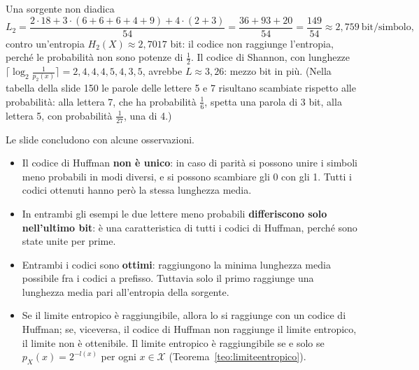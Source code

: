 \begin{esempio}{Una sorgente non diadica}
\[ L_2 = \frac{2 \cdot 18 + 3 \cdot (6 + 6 + 6 + 4 + 9) + 4 \cdot (2 + 3)}{54} = \frac{36 + 93 + 20}{54} = \frac{149}{54}
   \approx 2{,}759 \ \text{bit/simbolo} , \]
contro un'entropia $H_2(X) \approx 2{,}7017$ bit: il codice non raggiunge l'entropia, perché le probabilità non sono
potenze di $\frac12$. Il codice di Shannon, con lunghezze $\lceil \log_2 \frac{1}{p_2(x)} \rceil = 2, 4, 4, 4, 5, 4, 3,
5$, avrebbe $L \approx 3{,}26$: mezzo bit in più. (Nella tabella della slide 150 le parole delle lettere 5 e 7
risultano scambiate rispetto alle probabilità: alla lettera 7, che ha probabilità $\frac16$, spetta una parola di 3 bit,
alla lettera 5, con probabilità $\frac{1}{27}$, una di 4.)
\end{esempio}

Le slide concludono con alcune osservazioni.
\begin{itemize}
  \item Il codice di Huffman \textbf{non è unico}: in caso di parità si possono unire i simboli meno probabili in modi
        diversi, e si possono scambiare gli 0 con gli 1. Tutti i codici ottenuti hanno però la stessa lunghezza media.
  \item In entrambi gli esempi le due lettere meno probabili \textbf{differiscono solo nell'ultimo bit}: è una
        caratteristica di tutti i codici di Huffman, perché sono state unite per prime.
  \item Entrambi i codici sono \textbf{ottimi}: raggiungono la minima lunghezza media possibile fra i codici a prefisso.
        Tuttavia solo il primo raggiunge una lunghezza media pari all'entropia della sorgente.
  \item Se il limite entropico è raggiungibile, allora lo si raggiunge con un codice di Huffman; se, viceversa, il
        codice di Huffman non raggiunge il limite entropico, il limite non è ottenibile. Il limite entropico è
        raggiungibile se e solo se $p_X(x) = 2^{-l(x)}$ per ogni $x \in \mathcal{X}$ (Teorema~\ref{teo:limiteentropico}).
\end{itemize}


